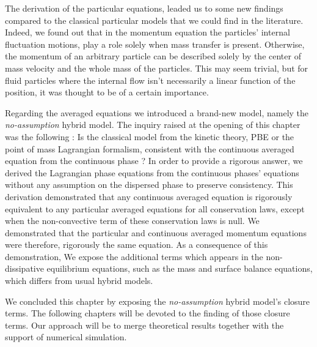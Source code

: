 The derivation of the particular equations, leaded us to some new findings compared to the classical particular models that we could find in the literature. 
Indeed, we found out that in the momentum equation the particles' internal fluctuation motions, play a role solely when mass transfer is present.
Otherwise, the momentum of an arbitrary particle can be described solely by the center of mass velocity and the whole mass of the particles. 
This may seem trivial, but for fluid particles where the internal flow isn't necessarily a linear function of the position, it was thought to be of a certain importance.   

Regarding the averaged equations we introduced a brand-new model, namely the \textit{no-assumption} hybrid model. 
The inquiry raised at the opening of this chapter was the following :
Is the classical model from the kinetic theory, PBE or the point of mass Lagrangian formalism, consistent with the continuous averaged equation from the continuous phase ? 
In order to provide a rigorous answer, we derived the Lagrangian phase equations from the continuous phases' equations without any assumption on the dispersed phase to preserve consistency. 
This derivation demonstrated that any continuous averaged equation is rigorously equivalent to any particular averaged equations for all conservation laws, except when the non-convective term of these conservation laws is null.
We demonstrated that the particular and continuous averaged momentum equations were therefore, rigorously the same equation. 
As a consequence of this demonstration, We expose the additional terms which appears in the non-dissipative equilibrium equations, such as the mass and surface balance equations, which differs from usual hybrid models.

We concluded this chapter by exposing the \textit{no-assumption} hybrid model's closure terms. 
The following chapters will be devoted to the finding of those closure terms. 
Our approach will be to merge theoretical results together with the support of numerical simulation.  